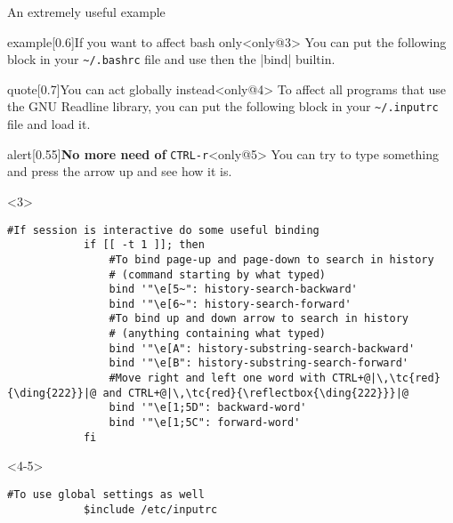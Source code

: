 \begin{frame}[fragile]{An extremely useful example}
    \begin{overlayarea}{\textwidth}{0.16\textheight}
        \vspace{-3mm}
        \begin{varblock}{example}[0.6\textwidth]{If you want to affect bash only}<only@3>
            You can put the following block in your \texttt{\textasciitilde/.bashrc} file and use then the \bash|bind| builtin.
        \end{varblock}
        \begin{varblock}{quote}[0.7\textwidth]{You can act globally instead}<only@4>
            \textnormal{To affect all programs that use the GNU Readline library, you can put the following block in your \texttt{\textasciitilde/.inputrc} file and load it.}
        \end{varblock}
        \begin{varblock}{alert}[0.55\textwidth]{\textbf{No more need of} \texttt{CTRL-r}}<only@5>
            You can try to type something and press the arrow up and see how it is.
        \end{varblock}
    \end{overlayarea}
    \begin{onlyenv}<3>
        \begin{lstlisting}[style=myBash, numbers=none]
            #If session is interactive do some useful binding
            if [[ -t 1 ]]; then
                #To bind page-up and page-down to search in history
                # (command starting by what typed)
                bind '"\e[5~": history-search-backward'
                bind '"\e[6~": history-search-forward'
                #To bind up and down arrow to search in history
                # (anything containing what typed)
                bind '"\e[A": history-substring-search-backward'
                bind '"\e[B": history-substring-search-forward'
                #Move right and left one word with CTRL+@|\,\tc{red}{\ding{222}}|@ and CTRL+@|\,\tc{red}{\reflectbox{\ding{222}}}|@
                bind '"\e[1;5D": backward-word'
                bind '"\e[1;5C": forward-word'
            fi
        \end{lstlisting}
    \end{onlyenv}
    \begin{onlyenv}<4-5>
        \begin{lstlisting}[style=myBash, numbers=none, commentstyle=\color{Gray}]
            #To use global settings as well
            $include /etc/inputrc


\end{lstlisting}
\end{onlyenv}
\end{frame}
